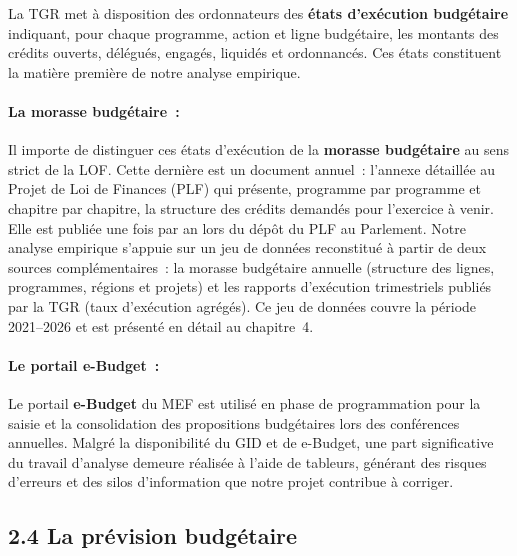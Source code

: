 La TGR met \`a disposition des ordonnateurs des \textbf{\'etats d'ex\'ecution budg\'etaire} indiquant, pour chaque programme, action et ligne budg\'etaire, les montants des cr\'edits ouverts, d\'el\'egu\'es, engag\'es, liquid\'es et ordonnanc\'es. Ces \'etats constituent la mati\`ere premi\`ere de notre analyse empirique.

\paragraph{La morasse budg\'etaire~:}

Il importe de distinguer ces \'etats d'ex\'ecution de la \textbf{morasse budg\'etaire} au sens strict de la LOF. Cette derni\`ere est un document annuel~: l'annexe d\'etaill\'ee au Projet de Loi de Finances (PLF) qui pr\'esente, programme par programme et chapitre par chapitre, la structure des cr\'edits demand\'es pour l'exercice \`a venir. Elle est publi\'ee une fois par an lors du d\'ep\^ot du PLF au Parlement. Notre analyse empirique s'appuie sur un jeu de donn\'ees reconstitu\'e \`a partir
de deux sources compl\'ementaires~: la morasse budg\'etaire annuelle (structure des
lignes, programmes, r\'egions et projets) et les rapports d'ex\'ecution trimestriels
publi\'es par la TGR (taux d'ex\'ecution agr\'eg\'es). Ce jeu de donn\'ees couvre
la p\'eriode 2021--2026 et est pr\'esent\'e en d\'etail au chapitre~4.

\paragraph{Le portail e-Budget~:}

Le portail \textbf{e-Budget} du MEF est utilis\'e en phase de programmation pour la saisie et la consolidation des propositions budg\'etaires lors des conf\'erences annuelles. Malgr\'e la disponibilit\'e du GID et de e-Budget, une part significative du travail d'analyse demeure r\'ealis\'ee \`a l'aide de tableurs, g\'en\'erant des risques d'erreurs et des silos d'information que notre projet contribue \`a corriger.

\subsection*{2.4 \quad La pr\'evision budg\'etaire}


